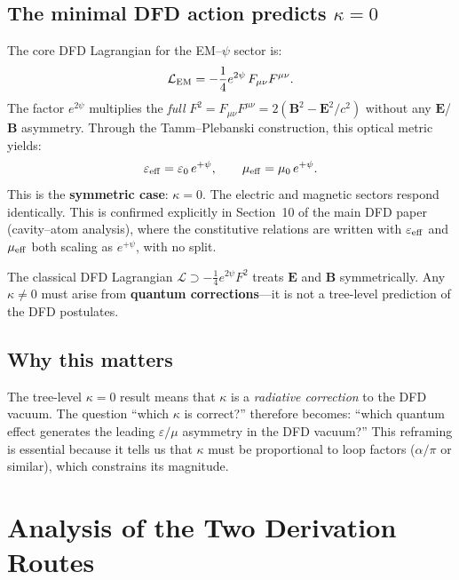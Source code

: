 \documentclass[11pt,a4paper]{article}
\newcommand{\vE}{\mathbf{E}}
\newcommand{\vB}{\mathbf{B}}
\begin{document}
\subsection{The minimal DFD action predicts $\kappa = 0$}

The core DFD Lagrangian for the EM--$\psi$ sector is:
\begin{equation}\label{eq:L-DFD}
\mathcal{L}_{\rm EM} = -\frac{1}{4}e^{2\psi}\,F_{\mu\nu}F^{\mu\nu}.
\end{equation}
The factor $e^{2\psi}$ multiplies the \emph{full} $F^2 = F_{\mu\nu}F^{\mu\nu}
= 2(\vB^2 - \vE^2/c^2)$ without any $\vE$/$\vB$ asymmetry.  Through the
Tamm--Plebanski construction, this optical metric yields:
\begin{equation}
\varepsilon_{\rm eff} = \varepsilon_0\, e^{+\psi}, \qquad
\mu_{\rm eff} = \mu_0\, e^{+\psi}.
\end{equation}
This is the \textbf{symmetric case}: $\kappa = 0$.  The electric and
magnetic sectors respond identically.  This is confirmed explicitly in
Section~10 of the main DFD paper (cavity--atom analysis), where the
constitutive relations are written with $\varepsilon_{\rm eff}$ and
$\mu_{\rm eff}$ both scaling as $e^{+\psi}$, with no split.

\begin{tcolorbox}[colback=yellow!5!white, colframe=yellow!60!black,
title=Key Point 1: The Minimal DFD Action Gives $\kappa = 0$]
The classical DFD Lagrangian $\mathcal{L} \supset -\frac{1}{4}e^{2\psi}F^2$
treats $\vE$ and $\vB$ symmetrically.  Any $\kappa \neq 0$ must arise from
\textbf{quantum corrections}---it is not a tree-level prediction of the
DFD postulates.
\end{tcolorbox}

\subsection{Why this matters}

The tree-level $\kappa = 0$ result means that $\kappa$ is a \emph{radiative
correction} to the DFD vacuum.  The question ``which $\kappa$ is correct?''
therefore becomes: ``which quantum effect generates the leading $\varepsilon/\mu$
asymmetry in the DFD vacuum?''  This reframing is essential because it tells
us that $\kappa$ must be proportional to loop factors ($\alpha/\pi$ or
similar), which constrains its magnitude.

\section{Analysis of the Two Derivation Routes}
\label{sec:analysis}
\end{document}
